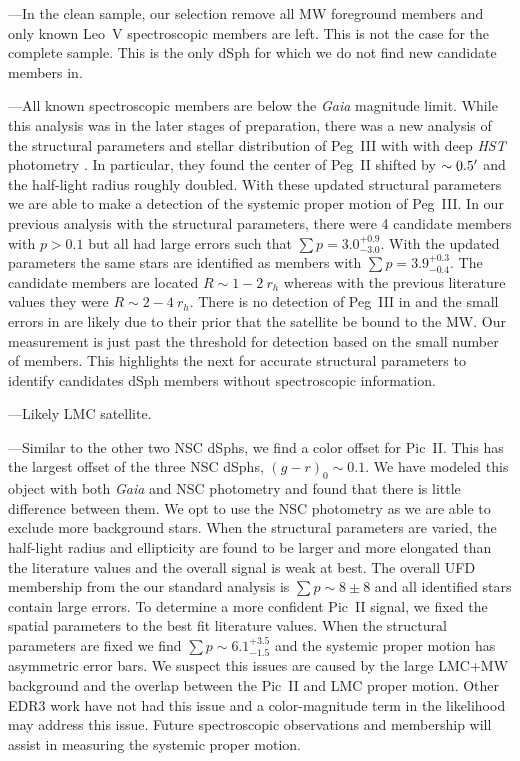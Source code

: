\documentclass[twocolumn]{aastex63}
\begin{document}
---In the clean sample, our selection remove all MW foreground members and only known Leo~V spectroscopic members are left.  This is not the case for the complete sample. This is the only dSph for which we do not find new candidate members in. 


---All known spectroscopic members \citep{Kim2016ApJ...833...16K} are below the  {\it Gaia} magnitude limit. 
While this analysis was in the later stages of preparation, there was a new analysis of the structural parameters and stellar distribution of Peg~III with with deep {\it HST} photometry  \citep{Richstein2022arXiv220401917R}. In particular, they found the center of Peg~II shifted by $\sim0.5\mbox{$^\prime$}$ and the  half-light radius roughly doubled. With these updated structural parameters we are able to make a  detection of the systemic proper motion of Peg~III. In our previous analysis with the \citet{Kim2016ApJ...833...16K} structural parameters, there were 4 candidate members with $p>0.1$ but all had large errors such that $\sum p = 3.0_{-3.0}^{+0.9}$. With the updated parameters the same stars are identified as members with $\sum p = 3.9_{-0.4}^{+0.3}$.  The  candidate members are {located} $R\sim1-2~r_h$   whereas with {the} previous literature values they were $R\sim2-4~r_h$. There is no detection of Peg~III in \citet{Battaglia2022A&A...657A..54B} and the small errors in \citet{McConnachie2020RNAAS...4..229M} are likely due to their prior that the satellite be bound to the MW. 
Our measurement is just past the threshold for detection based on the small number of members. 
This highlights the next for accurate structural parameters to identify candidates dSph members without spectroscopic information. 



---Likely LMC satellite.


---Similar to the other two NSC dSphs, we find a color offset for Pic~II.  This has the largest offset of the three NSC dSphs, $(g-r)_0\sim0.1$. We have modeled this object with both {\it Gaia} and NSC photometry and found that there is little difference between them.  We opt to use the NSC photometry as we are able to exclude more background stars.  
When the structural  parameters are varied, the half-light radius and ellipticity are found to be larger and more elongated than the literature values and the overall  signal is weak  at best.  The overall UFD membership from the our standard  analysis is $\sum p \sim 8 \pm 8$ and all identified stars contain large errors. 
To  determine a more confident Pic~II signal, we fixed the spatial parameters to the best fit literature values.   
When the structural parameters are fixed we find $\sum p \sim 6.1_{-1.5}^{+3.5}$ and the systemic proper motion has asymmetric error bars. 
We suspect this issues are caused by the large LMC+MW background and the overlap between the Pic~II and LMC proper motion. Other EDR3 work have not had this issue \citep{McConnachie2020RNAAS...4..229M, Battaglia2022A&A...657A..54B} and a color-magnitude term in the likelihood may address this issue. Future spectroscopic observations and membership will  assist in measuring the systemic proper motion. 
\end{document}
